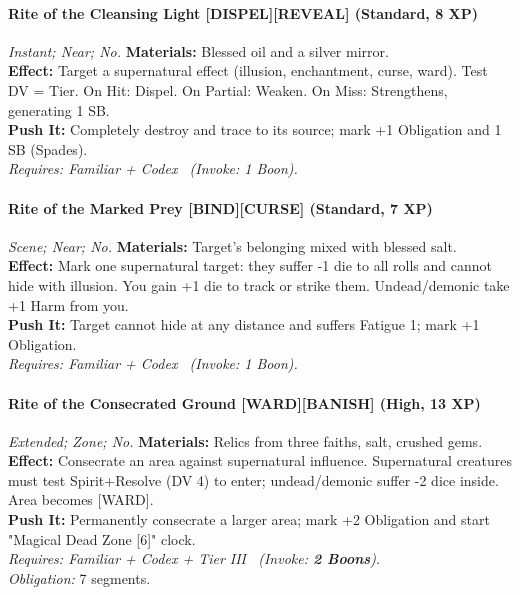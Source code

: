 \paragraph{Rite of the Cleansing Light \textnormal{[DISPEL][REVEAL]} (Standard, 8 XP)} \emph{Instant; Near; No.}
\textbf{Materials:} Blessed oil and a silver mirror.\\
\textbf{Effect:} Target a supernatural effect (illusion, enchantment, curse, ward). Test DV = Tier. On Hit: Dispel. On Partial: Weaken. On Miss: Strengthens, generating 1 SB.\\
\textbf{Push It:} Completely destroy and trace to its source; mark +1 Obligation and 1 SB (Spades).\\
\emph{Requires: Familiar + Codex \ (\textit{Invoke:} 1 Boon).}

\paragraph{Rite of the Marked Prey \textnormal{[BIND][CURSE]} (Standard, 7 XP)} \emph{Scene; Near; No.}
\textbf{Materials:} Target's belonging mixed with blessed salt.\\
\textbf{Effect:} Mark one supernatural target: they suffer -1 die to all rolls and cannot hide with illusion. You gain +1 die to track or strike them. Undead/demonic take +1 Harm from you.\\
\textbf{Push It:} Target cannot hide at any distance and suffers Fatigue 1; mark +1 Obligation.\\
\emph{Requires: Familiar + Codex \ (\textit{Invoke:} 1 Boon).}

\paragraph{Rite of the Consecrated Ground \textnormal{[WARD][BANISH]} (High, 13 XP)} \emph{Extended; Zone; No.}
\textbf{Materials:} Relics from three faiths, salt, crushed gems.\\
\textbf{Effect:} Consecrate an area against supernatural influence. Supernatural creatures must test Spirit+Resolve (DV 4) to enter; undead/demonic suffer -2 dice inside. Area becomes [WARD].\\
\textbf{Push It:} Permanently consecrate a larger area; mark +2 Obligation and start "Magical Dead Zone [6]" clock.\\
\emph{Requires: Familiar + Codex + Tier III \ (\textit{Invoke:} \textbf{2 Boons}).}\\
\emph{Obligation:} 7 segments.

